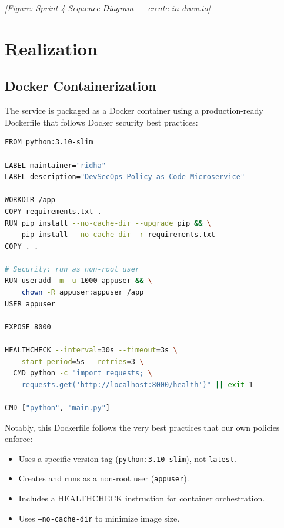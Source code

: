
\textit{[Figure: Sprint 4 Sequence Diagram — create in draw.io]}

\section{Realization}

\subsection{Docker Containerization}

The service is packaged as a Docker container using a production-ready Dockerfile that follows Docker security best practices:

\begin{lstlisting}[language=bash, caption={Dockerfile — production-ready container}, label={lst:dockerfile}]
FROM python:3.10-slim

LABEL maintainer="ridha"
LABEL description="DevSecOps Policy-as-Code Microservice"

WORKDIR /app
COPY requirements.txt .
RUN pip install --no-cache-dir --upgrade pip && \
    pip install --no-cache-dir -r requirements.txt
COPY . .

# Security: run as non-root user
RUN useradd -m -u 1000 appuser && \
    chown -R appuser:appuser /app
USER appuser

EXPOSE 8000

HEALTHCHECK --interval=30s --timeout=3s \
  --start-period=5s --retries=3 \
  CMD python -c "import requests; \
    requests.get('http://localhost:8000/health')" || exit 1

CMD ["python", "main.py"]
\end{lstlisting}

\noindent Notably, this Dockerfile follows the very best practices that our own policies enforce:
\begin{itemize}
    \item Uses a specific version tag (\texttt{python:3.10-slim}), not \texttt{latest}.
    \item Creates and runs as a non-root user (\texttt{appuser}).
    \item Includes a HEALTHCHECK instruction for container orchestration.
    \item Uses \texttt{--no-cache-dir} to minimize image size.
\end{itemize}

